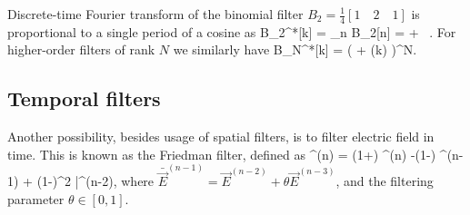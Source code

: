 \documentclass{aa}
\begin{document}
Discrete-time Fourier transform of the binomial filter $B_2 = \frac{1}{4}[1 \quad 2 \quad 1]$ is proportional to a single period of a cosine as 
\be
B_2^*[k] = \sum_n B_2[n] \cos[k n] =  +  \cos[k].
\ee
For higher-order filters of rank $N$ we similarly have
\be
B_N^*[k] = \left(  + \cos(k) \right)^N.
\ee





\subsection{Temporal filters}
Another possibility, besides usage of spatial filters, is to filter electric field in time.
This is known as the Friedman filter, defined as
\be
{}^{(n)} = 
    \left(1+\right) ^{(n)}
   -\left(1-\right) ^{(n-1)}
   + (1-\theta)^2 \bar{}^{(n-2)},
\ee
where $\bar{\vec{E}}^{(n-1)} = \vec{E}^{(n-2)} + \theta \vec{E}^{(n-3)}$, and the filtering parameter $\theta \in [0,1]$.






\onecolumn
\begin{appendix}
\end{appendix}
\end{document}
